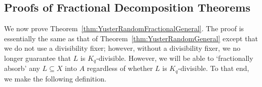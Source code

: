 \documentclass[11pt]{article}
\numberwithin{equation}{section}
\newcommand{\mc}[1]{\mathcal{#1}}
\newcounter{i}
\theoremstyle{plain}
\theoremstyle{plain} %
\theoremstyle{definition}
\begin{document}

\subsection{Proofs of Fractional Decomposition Theorems}

We now prove Theorem~\ref{thm:YusterRandomFractionalGeneral}. The proof is essentially the same as that of Theorem~\ref{thm:YusterRandomGeneral} except that we do not use a divisibility fixer; however, without a divisibility fixer, we no longer guarantee that $L$ is $K_q$-divisible. However, we will be  able to `fractionally absorb' any $L\subseteq X$ into $A$ regardless of whether $L$ is $K_q$-divisible. To that end, we make the following definition.
\end{document}
